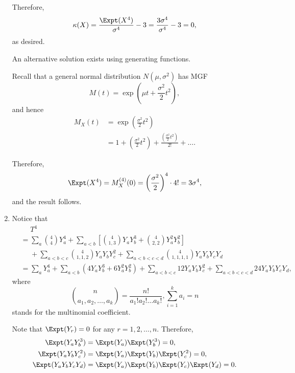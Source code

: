 \begin{enumerate}
          Therefore,
          \[
              \kappa(X) = \frac{\Expt(X^4)}{\sigma^4} - 3 = \frac{3 \sigma^4}{\sigma^4} - 3 = 0,
          \]
          as desired.

          An alternative solution exists using generating functions.

          Recall that a general normal distribution \(N(\mu, \sigma^2)\) has MGF
          \[
              M(t) = \exp(\mu t + \frac{\sigma^2}{2}t^2),
          \]
          and hence
          \begin{align*}
              M_X(t) & = \exp \left(\frac{\sigma^2}{2}t^2\right)                                                          \\
                     & = 1 + \left(\frac{\sigma^2}{2}t^2\right) + \frac{\left(\frac{\sigma^2}{2}t^2\right)}{2!} + \ldots.
          \end{align*}

          Therefore,
          \[
              \Expt(X^4) = M^{(4)}_X(0) = \left(\frac{\sigma^2}{2}\right)^4 \cdot 4! = 3 \sigma^4,
          \]
          and the result follows.

    \item Notice that
          \begin{align*}
               & \phantom{=} T^4                                                                                                                          \\
               & = \sum_{a} \binom{4}{4} Y_a^4 + \sum_{a < b} \left[\binom{4}{1, 3}Y_a Y_b^3 + \binom{4}{2, 2}Y_a^2 Y_b^2\right]                          \\
               & \phantom{=} + \sum_{a < b < c} \binom{4}{1, 1, 2}Y_a Y_b Y_c^2 + \sum_{a < b < c < d} \binom{4}{1, 1, 1, 1} Y_a Y_b Y_c Y_d              \\
               & = \sum_{a}Y_a^4 + \sum_{a < b} (4Y_a Y_b^3 + 6Y_a^2 Y_b^2) + \sum_{a < b < c} 12Y_a Y_b Y_c^2 + \sum_{a < b < c < d} 24 Y_a Y_b Y_c Y_d,
          \end{align*}
          where
          \[
              \binom{n}{a_1, a_2, \ldots, a_k} = \frac{n!}{a_1!a_2!\ldots a_k!}, \sum_{i = 1}^{k} a_i = n
          \]
          stands for the multinomial coefficient.

          Note that \(\Expt(Y_r) = 0\) for any \(r = 1, 2, \ldots, n\). Therefore,
          \begin{align*}
              \Expt(Y_a Y_b^3)       & = \Expt(Y_a) \Expt(Y_b^3) = 0,                     \\
              \Expt(Y_a Y_b Y_c^2)   & = \Expt(Y_a) \Expt(Y_b) \Expt(Y_c^2) = 0,          \\
              \Expt(Y_a Y_b Y_c Y_d) & = \Expt(Y_a) \Expt(Y_b) \Expt(Y_c) \Expt(Y_d) = 0.
          \end{align*}


\end{enumerate}
